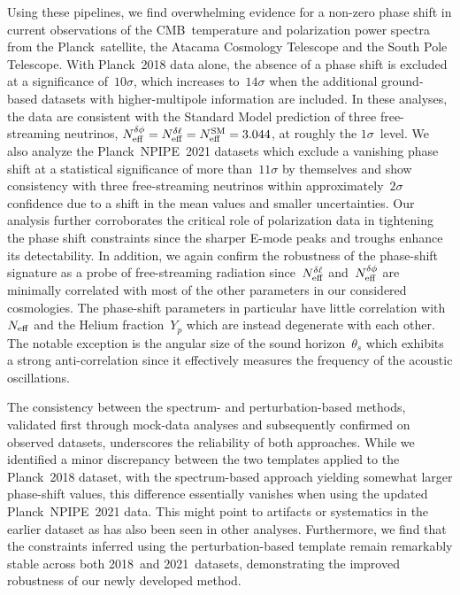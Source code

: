 Using these pipelines, we find overwhelming evidence for a non-zero phase shift in current observations of the CMB~temperature and polarization power spectra from the Planck~satellite, the Atacama Cosmology Telescope and the South Pole Telescope. With Planck~2018 data alone, the absence of a phase shift is excluded at a significance of~$10\sigma$, which increases to~$14\sigma$ when the additional ground-based datasets with higher-multipole information are included. In these analyses, the data are consistent with the Standard Model prediction of three free-streaming neutrinos, $N_\mathrm{eff}^{\delta\phi} = N_\mathrm{eff}^{\delta\ell} = N_\mathrm{eff}^\mathrm{SM} = 3.044$, at roughly the $1\sigma$~level. We also analyze the Planck~NPIPE~2021 datasets which exclude a vanishing phase shift at a statistical significance of more than~$11\sigma$ by themselves and show consistency with three free-streaming neutrinos within approximately~$2\sigma$ confidence due to a shift in the mean values and smaller uncertainties. Our analysis further corroborates the critical role of polarization data in tightening the phase shift constraints since the sharper E-mode peaks and troughs enhance its detectability. In addition, we again confirm the robustness of the phase-shift signature as a probe of free-streaming radiation since~$N_\mathrm{eff}^{\delta\ell}$ and~$N_\mathrm{eff}^{\delta\phi}$ are minimally correlated with most of the other parameters in our considered cosmologies. The phase-shift parameters in particular have little correlation with~$N_\mathrm{eff}$ and the Helium fraction~$Y_p$ which are instead degenerate with each other. The notable exception is the angular size of the sound horizon~$\theta_s$ which exhibits a strong anti-correlation since it effectively measures the frequency of the acoustic oscillations.

The consistency between the spectrum- and perturbation-based methods, validated first through mock-data analyses and subsequently confirmed on observed datasets, underscores the reliability of both approaches. While we identified a minor discrepancy between the two templates applied to the Planck~2018 dataset, with the spectrum-based approach yielding somewhat larger phase-shift values, this difference essentially vanishes when using the updated Planck~NPIPE~2021 data. This might point to artifacts or systematics in the earlier dataset as has also been seen in other analyses. Furthermore, we find that the constraints inferred using the perturbation-based template remain remarkably stable across both 2018~and 2021~datasets, demonstrating the improved robustness of our newly developed method.


